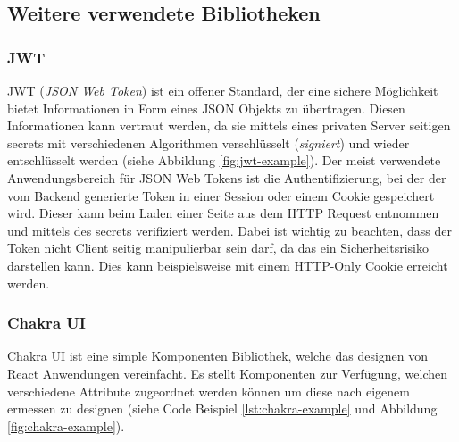 \documentclass[a4paper,12pt]{report}
\newcommand{\footcite}[1]{\footnotemark\footnotetext{\cite{#1}}}
\begin{document}
        \subsection{Weitere verwendete Bibliotheken}
        \label{sec:weiteres}
        \subsubsection{JWT}
        \label{sec:JWT}
JWT (\textit{JSON Web Token}) ist ein offener Standard, der eine sichere Möglichkeit bietet Informationen in Form eines JSON Objekts zu übertragen\footcite{JWT}. Diesen Informationen kann vertraut werden, da sie mittels eines privaten Server seitigen secrets mit verschiedenen Algorithmen  verschlüsselt (\textit{signiert}) und wieder entschlüsselt werden (siehe Abbildung \ref{fig:jwt-example}). Der meist verwendete Anwendungsbereich für JSON Web Tokens ist die Authentifizierung, bei der der vom Backend generierte Token in einer Session oder einem Cookie gespeichert wird. Dieser kann beim Laden einer Seite aus dem HTTP Request entnommen und mittels des secrets verifiziert werden. Dabei ist wichtig zu beachten, dass der Token nicht Client seitig manipulierbar sein darf, da das ein Sicherheitsrisiko darstellen kann. Dies kann beispielsweise mit einem HTTP-Only Cookie\footcite{Http-only} erreicht werden.
 
        \subsubsection{Chakra UI}
        \label{sec:chakraUI}
Chakra UI ist eine simple Komponenten Bibliothek, welche das designen von React Anwendungen vereinfacht\footcite{chakraui}. Es stellt Komponenten zur Verfügung, welchen verschiedene Attribute zugeordnet werden können um diese nach eigenem ermessen zu designen (siehe Code Beispiel \ref{lst:chakra-example} und Abbildung \ref{fig:chakra-example}).
\end{document}
